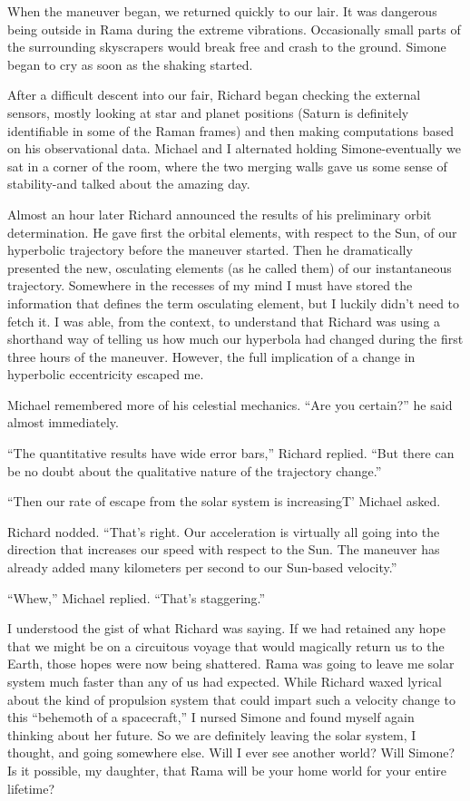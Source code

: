 \documentclass[]{article}
\begin{document}
When the maneuver began, we returned quickly to our lair.  It was dangerous being outside in Rama during the extreme vibrations.  Occasionally small parts of the surrounding skyscrapers would break free and crash to the ground.  Simone began to cry as soon as the shaking started.

After a difficult descent into our fair, Richard began checking the external sensors, mostly looking at star and planet positions (Saturn is definitely identifiable in some of the Raman frames) and then making computations based on his observational data.  Michael and I alternated holding Simone-eventually we sat in a corner of the room, where the two merging walls gave us some sense of stability-and talked about the amazing day.

Almost an hour later Richard announced the results of his preliminary orbit determination.  He gave first the orbital elements, with respect to the Sun, of our hyperbolic trajectory before the maneuver started.  Then he dramatically presented the new, osculating elements (as he called them) of our instantaneous trajectory.  Somewhere in the recesses of my mind I must have stored the information that defines the term osculating element, but I luckily didn’t need to fetch it.  I was able, from the context, to understand that Richard was using a shorthand way of telling us how much our hyperbola had changed during the first three hours of the maneuver.  However, the full implication of a change in hyperbolic eccentricity escaped me.

Michael remembered more of his celestial mechanics.  “Are you certain?” he said almost immediately.

“The quantitative results have wide error bars,” Richard replied.  “But there can be no doubt about the qualitative nature of the trajectory change.”

“Then our rate of escape from the solar system is increasingT’ Michael asked.

Richard nodded.  “That’s right.  Our acceleration is virtually all going into the direction that increases our speed with respect to the Sun.  The maneuver has already added many kilometers per second to our Sun-based velocity.”

“Whew,” Michael replied.  “That’s staggering.”

I understood the gist of what Richard was saying.  If we had retained any hope that we might be on a circuitous voyage that would magically return us to the Earth, those hopes were now being shattered.  Rama was going to leave me solar system much faster than any of us had expected.  While Richard waxed lyrical about the kind of propulsion system that could impart such a velocity change to this “behemoth of a spacecraft,” I nursed Simone and found myself again thinking about her future.  So we are definitely leaving the solar system, I thought, and going somewhere else.  Will I ever see another world? Will Simone? Is it possible, my daughter, that Rama will be your home world for your entire lifetime?
\end{document}
